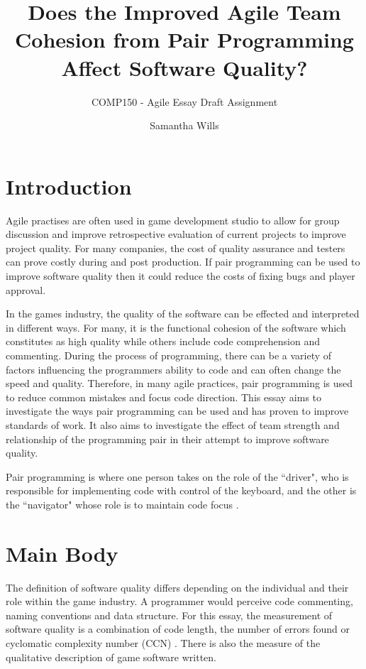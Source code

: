 \documentclass{scrartcl}
\title{Does the Improved Agile Team Cohesion from Pair Programming Affect Software Quality?}
\subtitle{COMP150 - Agile Essay Draft Assignment}
\author{Samantha Wills}
\begin{document}
\maketitle

\section*{Introduction}
Agile practises are often used in game development studio to allow for group discussion and improve retrospective evaluation of current projects to improve project quality. For many companies, the cost of quality assurance and testers can prove costly during and post production. If pair programming can be used to improve software quality then it could reduce the costs of fixing bugs and player approval.

In the games industry, the quality of the software can be effected and interpreted in different ways. For many, it is the functional cohesion of the software which constitutes as high quality while others include code comprehension and commenting. During the process of programming, there can be a variety of factors influencing the programmers ability to code and can often change the speed and quality. Therefore, in many agile practices, pair programming is used to reduce common mistakes and focus code direction. This essay aims to investigate the ways pair programming can be used and has proven to improve standards of work. It also aims to investigate the effect of team strength and relationship of the programming pair in their attempt to improve software quality.

Pair programming is where one person takes on the role of the ``driver", who is responsible for implementing code with control of the keyboard\cite{Hofer:2008}, and the other is the ``navigator" whose role is to maintain code focus \cite{Hulkko:2005}. 

\section*{Main Body}

The definition of software quality differs depending on the individual and their role within the game industry. A programmer would perceive code commenting, naming conventions and data structure. For this essay, the measurement of software quality is a combination of code length, the number of errors found or cyclomatic complexity number (CCN)\cite{Xenos:2000} . There is also the measure of the qualitative description of game software written.
\end{document}
